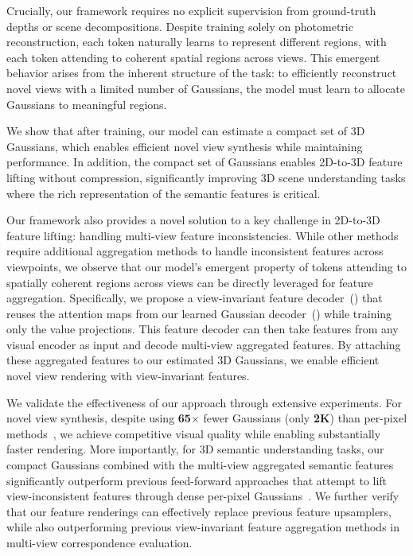 Crucially, our framework requires no explicit supervision from ground-truth depths or scene decompositions. Despite training solely on photometric reconstruction, each token naturally learns to represent different regions, with each token attending to coherent spatial regions across views. This emergent behavior arises from the inherent structure of the task: to efficiently reconstruct novel views with a limited number of Gaussians, the model must learn to allocate Gaussians to meaningful regions. 

We show that after training, our model can estimate a compact set of 3D Gaussians, which enables efficient novel view synthesis while maintaining performance. In addition, the compact set of Gaussians enables 2D-to-3D feature lifting without compression, significantly improving 3D scene understanding tasks where the rich representation of the semantic features is critical.




Our framework also provides a novel solution to a key challenge in 2D-to-3D feature lifting: handling multi-view feature inconsistencies. While other methods~\cite{zeid2025dino, lee2025cf3, cheng2024occam, marrie2025ludvig} require additional aggregation methods to handle inconsistent features across viewpoints, we observe that our model's emergent property of tokens attending to spatially coherent regions across views can be directly leveraged for feature aggregation. Specifically, we propose a view-invariant feature decoder~(\textbf{\oursF}) that reuses the attention maps from our learned Gaussian decoder~(\textbf{\ours}) while training only the value projections. This feature decoder can then take features from any visual encoder as input and decode multi-view aggregated features. By attaching these aggregated features to our estimated 3D Gaussians, we enable efficient novel view rendering with view-invariant features.

We validate the effectiveness of our approach through extensive experiments. For novel view synthesis, despite using \textbf{65$\times$} fewer Gaussians (only \textbf{2K}) than per-pixel methods~\cite{ye2024no,huang2025no}, we achieve competitive visual quality while enabling substantially faster rendering. More importantly, for 3D semantic understanding tasks, our compact Gaussians combined with the multi-view aggregated semantic features significantly outperform previous feed-forward approaches that attempt to lift view-inconsistent features through dense per-pixel Gaussians~\cite{fan2024large}. We further verify that our feature renderings can effectively replace previous feature upsamplers, while also outperforming previous view-invariant feature aggregation methods in multi-view correspondence evaluation.